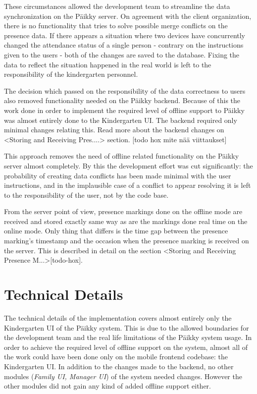 These circumstances allowed the development team to streamline the data synchronization on the Päikky server. On agreement with the client organization, there is no functionality that tries to solve possible merge conflicts on the presence data. If there appears a situation where two devices have concurrently changed the attendance status of a single person - contrary on the instructions given to the users - both of the changes are saved to the database. Fixing the data to reflect the situation happened in the real world is left to the responsibility of the kindergarten personnel.

The decision which passed on the responsibility of the data correctness to users also removed functionality needed on the Päikky backend. Because of this the work done in order to implement the required level of offline support to Päikky was almost entirely done to the Kindergarten UI. The backend required only minimal changes relating this. Read more about the backend changes on <Storing and Receiving Pres....> section. [todo hox mite nää viittaukset]

This approach removes the need of offline related functionality on the Päikky server almost completely. By this the development effort was cut significantly: the probability of creating data conflicts has been made minimal with the user instructions, and in the implausible case of a conflict to appear resolving it is left to the responsibility of the user, not by the code base. 

From the server point of view, presence markings done on the offline mode are received and stored exactly same way as are the markings done real time on the online mode. Only thing that differs is the time gap between the presence marking's timestamp and the occasion when the presence marking is received on the server. This is described in detail on the section <Storing and Receiving Presence M...>[todo-hox]. %





\section{Technical Details}
The technical details of the implementation covers almost entirely only the Kindergarten UI of the Päikky system. This is due to the allowed boundaries for the development team and the real life limitations of the Päikky system usage. In order to achieve the required level of offline support on the system, almost all of the work could have been done only on the mobile frontend codebase: the Kindergarten UI. In addition to the changes made to the backend, no other modules (\textit{Family UI, Manager UI}) of the system needed changes. However the other modules did not gain any kind of added offline support either.


